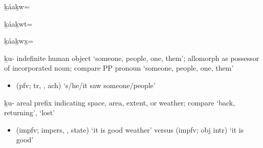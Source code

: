 \begin{morphdesc}[resume*=alphalist]
\item[ḵáaḵw=]\label{m:ḵáaḵw=}

\item[ḵáaḵwt=]\label{m:ḵáaḵwt=}

\item[ḵáaḵwx̱=]\label{m:ḵáaḵwx̱=}

\item[ḵu-]\label{m:ḵu-indef}
	indefinite human object ‘someone, people, one, them’;
	allomorph  as possessor of incorporated noun;
	compare PP pronoun  ‘someone, people, one, them’
	\begin{itemize}
	\item	{} (pfv; tr, , ach) ‘s/he/it saw someone/people’
	\end{itemize}

\item[ḵu-]\label{m:ḵu-areal}
	areal prefix indicating space, area, extent, or weather;
	compare  ‘back, returning’,  ‘lost’
	\begin{itemize}
	\item	{} (impfv; impers, ,  state) ‘it is good weather’\newline
		versus  (impfv; obj intr) ‘it is good’
	\end{itemize}


\end{morphdesc}
